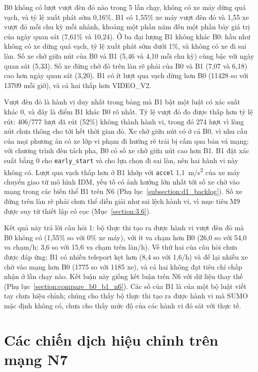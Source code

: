 \documentclass[../main.tex]{subfiles}
\begin{document}
B0 không có lượt vượt đèn đỏ nào trong 5 lần chạy, không có xe máy dừng quá vạch, và tỷ lệ xuất phát sớm 0,16\%. B1 có 1,55\% xe máy vượt đèn đỏ và 1,55 xe vượt đỏ mỗi chu kỳ mỗi nhánh, khoảng một phần năm đến một phần bảy giá trị của ngày quan sát (7,61\% và 10,24). Ở ba đại lượng B1 không khác B0: hầu như không có xe dừng quá vạch, tỷ lệ xuất phát sớm dưới 1\%, và không có xe đi sai làn. Số xe chờ giữa nút của B0 và B1 (5,46 và 4,10 mỗi chu kỳ) cùng bậc với ngày quan sát (5,33). Số xe đứng chờ đỏ trên làn rẽ phải của B0 và B1 (7,07 và 6,18) cao hơn ngày quan sát (3,20). B1 có ít lượt qua vạch dừng hơn B0 (11428 so với 13709 mỗi giờ), và cả hai thấp hơn VIDEO\_V2.

Vượt đèn đỏ là hành vi duy nhất trong bảng mà B1 bật một luật có xác suất khác 0, và đây là điểm B1 khác B0 rõ nhất. Tỷ lệ vượt đỏ đo được thấp hơn tỷ lệ rút: 406/777 lượt đã rút (52\%) không thành hành vi, trong đó 274 lượt vì lòng nút chưa thông cho tới hết thời gian đỏ. Xe chờ giữa nút có ở cả B0, vì nhu cầu của mọi phương án có xe lớp vi phạm đi hướng rẽ trái bị cấm qua bản vá mạng; với chương trình đèn tách pha, B0 có số xe chờ giữa nút cao hơn B1. B1 đặt xác suất bằng 0 cho \texttt{early\_start} và cho lựa chọn đi sai làn, nên hai hành vi này không có. Lượt qua vạch thấp hơn ở B1 khớp với \texttt{accel} 1,1~m/s\textsuperscript{2} của xe máy chuyển giao từ mô hình IDM, yếu tố có ảnh hưởng lớn nhất tới số xe chờ vào mạng trong các biến thể B1 trên N6 (Phụ lục~\ref{subsection:d1_backlog}). Số xe đứng trên làn rẽ phải chưa thể diễn giải như sai lệch hành vi, vì mục tiêu M9 được suy từ thiết lập có cọc (Mục~\ref{section:3.6}).

Kết quả này trả lời câu hỏi 1: bộ thực thi tạo ra được hành vi vượt đèn đỏ mà B0 không có (1,55\% so với 0\% xe máy), với ít va chạm hơn B0 (26,0 so với 54,0 va chạm/h; 3,6 so với 15,6 va chạm trên làn/h). Vế thứ hai của câu hỏi chưa được đáp ứng: B1 có nhiều teleport kẹt hơn (8,4 so với 1,6/h) và để lại nhiều xe chờ vào mạng hơn B0 (1775 so với 1185 xe), và cả hai không đạt tiêu chí chấp nhận ở lần chạy nào. Kết luận này giống kết luận trên N6 với dữ liệu thay thế (Phụ lục~\ref{section:compare_b0_b1_n6}). Các số của B1 là của một bộ luật viết tay chưa hiệu chỉnh; chúng cho thấy bộ thực thi tạo ra được hành vi mà SUMO mặc định không có, chưa cho thấy mức độ của các hành vi đó sát với thực tế.

\section{Các chiến dịch hiệu chỉnh trên mạng N7}
\label{subsection:campaigns_n1108}
\end{document}
